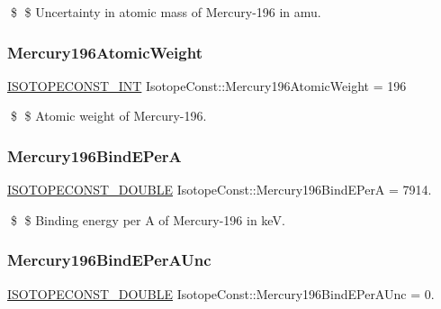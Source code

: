 \$ \$ Uncertainty in atomic mass of Mercury-\/196 in amu. \mbox{\label{group___isotope_const-_mercury-_hg196_ga6332cbf8736486ec639e3540fa054959}} 
\subsubsection{\texorpdfstring{Mercury196\+Atomic\+Weight}{Mercury196AtomicWeight}}
{\footnotesize\ttfamily \mbox{\hyperlink{group___isotope_const-_macros_ga5f18360b3e99483a35c32d789e62621c}{I\+S\+O\+T\+O\+P\+E\+C\+O\+N\+S\+T\+\_\+\+I\+NT}} Isotope\+Const\+::\+Mercury196\+Atomic\+Weight = 196}

\$ \$ Atomic weight of Mercury-\/196. \mbox{\label{group___isotope_const-_mercury-_hg196_ga35f475c1f3e12b8e05f0ba33cd309372}} 
\subsubsection{\texorpdfstring{Mercury196\+Bind\+E\+PerA}{Mercury196BindEPerA}}
{\footnotesize\ttfamily \mbox{\hyperlink{group___isotope_const-_macros_ga8f45a7272ce02c0b4c65c44636ed719a}{I\+S\+O\+T\+O\+P\+E\+C\+O\+N\+S\+T\+\_\+\+D\+O\+U\+B\+LE}} Isotope\+Const\+::\+Mercury196\+Bind\+E\+PerA = 7914.}

\$ \$ Binding energy per A of Mercury-\/196 in keV. \mbox{\label{group___isotope_const-_mercury-_hg196_ga64040aa93abcd6eef4bb815654d913c7}} 
\subsubsection{\texorpdfstring{Mercury196\+Bind\+E\+Per\+A\+Unc}{Mercury196BindEPerAUnc}}
{\footnotesize\ttfamily \mbox{\hyperlink{group___isotope_const-_macros_ga8f45a7272ce02c0b4c65c44636ed719a}{I\+S\+O\+T\+O\+P\+E\+C\+O\+N\+S\+T\+\_\+\+D\+O\+U\+B\+LE}} Isotope\+Const\+::\+Mercury196\+Bind\+E\+Per\+A\+Unc = 0.}

